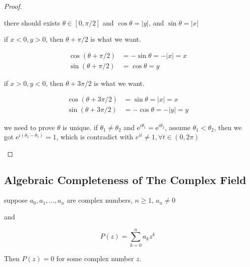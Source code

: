 \begin{proof}
\begin{enumerate}
\begin{enumerate}
        there should exists $\theta \in [0,\pi/2]$ and $\cos \theta = |y|$, and $\sin \theta = |x|$

        if $x < 0, y > 0$, then $\theta + \pi/2$ is what we want.

        \begin{align*}
            \cos (\theta + \pi/2) & =  -\sin \theta = - |x| = x \\
            \sin (\theta + \pi/2) & =  \cos \theta = y
        \end{align*}

        if $x > 0, y < 0$, then $\theta + 3\pi/2$ is what we want.

        \begin{align*}
            \cos (\theta + 3\pi/2) & =  \sin \theta = |x| = x \\
            \sin (\theta + 3\pi/2) & =  -\cos \theta = -|y| = y
        \end{align*}
    \end{enumerate}

    we need to prove $\theta$ is unique. if $\theta_1 \ne \theta_2$ and $\mathrm{e}^{i\theta_1} = \mathrm{e}^{i \theta_2}$,
    assume $\theta_1 < \theta_2$, then we got $\mathrm{e}^{i(\theta_2 - \theta_1)} = 1$, which is contradict with $e^{it} \ne 1, \forall t \in (0,2\pi)$

    \end{enumerate}

    
    
\end{proof}

\subsection{Algebraic Completeness of The Complex Field}

\begin{thm}
    suppose $a_0,a_1,...,a_n$ are complex numbers, $n \ge 1$, $a_n \ne 0$

    and 

    \[
        P(z) = \sum_{k=0}^n a_kz^k
    \]

    Then $P(z) = 0$ for some complex number $z$.
\end{thm}

